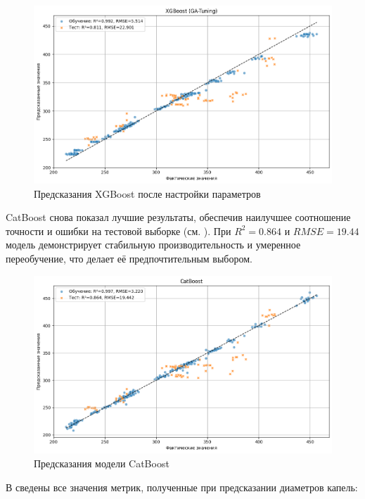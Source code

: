 \begin{figure}[htbp!]
	\centering
	\includegraphics[width=.9\linewidth]{my_folder/images/droplet_size/XGBoost.png}
	\caption{Предсказания XGBoost после настройки параметров} 
	\label{fig:droplet-size-xgboost}  
\end{figure}

\newpage

CatBoost снова показал лучшие результаты, обеспечив наилучшее соотношение точности и ошибки на тестовой выборке (см. ). При $R^2 = 0.864$ и $RMSE = 19.44$ модель демонстрирует стабильную производительность и умеренное переобучение, что делает её предпочтительным выбором.


\begin{figure}[htbp!]
	\centering
	\includegraphics[width=.9\linewidth]{my_folder/images/droplet_size/CatBoost.png}
	\caption{Предсказания модели CatBoost} 
	\label{fig:droplet-size-catboost}  
\end{figure}

В  сведены все значения метрик, полученные при предсказании диаметров капель:

